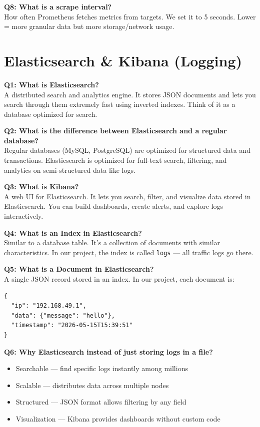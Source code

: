 \documentclass[12pt,a4paper]{article}
\begin{document}
\textbf{Q8: What is a scrape interval?}\\
How often Prometheus fetches metrics from targets. We set it to 5 seconds. Lower = more granular data but more storage/network usage.

\section{Elasticsearch \& Kibana (Logging)}

\textbf{Q1: What is Elasticsearch?}\\
A distributed search and analytics engine. It stores JSON documents and lets you search through them extremely fast using inverted indexes. Think of it as a database optimized for search.

\textbf{Q2: What is the difference between Elasticsearch and a regular database?}\\
Regular databases (MySQL, PostgreSQL) are optimized for structured data and transactions. Elasticsearch is optimized for full-text search, filtering, and analytics on semi-structured data like logs.

\textbf{Q3: What is Kibana?}\\
A web UI for Elasticsearch. It lets you search, filter, and visualize data stored in Elasticsearch. You can build dashboards, create alerts, and explore logs interactively.

\textbf{Q4: What is an Index in Elasticsearch?}\\
Similar to a database table. It's a collection of documents with similar characteristics. In our project, the index is called \texttt{logs} --- all traffic logs go there.

\textbf{Q5: What is a Document in Elasticsearch?}\\
A single JSON record stored in an index. In our project, each document is:
\begin{verbatim}
{
  "ip": "192.168.49.1",
  "data": {"message": "hello"},
  "timestamp": "2026-05-15T15:39:51"
}
\end{verbatim}

\textbf{Q6: Why Elasticsearch instead of just storing logs in a file?}
\begin{itemize}[noitemsep]
    \item Searchable --- find specific logs instantly among millions
    \item Scalable --- distributes data across multiple nodes
    \item Structured --- JSON format allows filtering by any field
    \item Visualization --- Kibana provides dashboards without custom code
\end{itemize}
\end{document}
